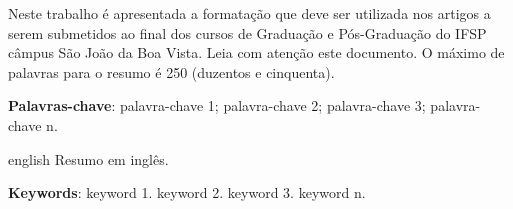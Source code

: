 \documentclass[
	article,
	11pt,
	oneside,
	a4paper,
	chapter=TITLE,
	section=TITLE,
	english,
	brazil,
	sumario=tradicional
]{abntex2}
\begin{document}
	
	
	\frenchspacing 
	
	
    
	\maketitle
    
	\begin{resumoumacoluna}
		
		Neste trabalho é apresentada a formatação que deve ser utilizada nos artigos a serem submetidos ao final dos cursos de Graduação e Pós-Graduação do IFSP câmpus São João da Boa Vista. Leia com atenção este documento. O máximo de palavras para o resumo é 250 (duzentos e cinquenta). 
		
		\vspace{\onelineskip}
		
		\noindent
        \textbf{Palavras-chave}: palavra-chave 1; palavra-chave 2; palavra-chave 3; palavra-chave n.
		
	\end{resumoumacoluna}
	
    \renewcommand{\resumoname}{Abstract}
    \begin{resumoumacoluna}
    	
        \begin{otherlanguage*}{english}
   	    	Resumo em inglês.
   		
       		\vspace{\onelineskip}
   		
   	    	\noindent
   		    \textbf{Keywords}: keyword 1. keyword 2. keyword 3. keyword n.
   		   
      \end{otherlanguage*} 
  
   	\end{resumoumacoluna}
        
	
\end{document}

